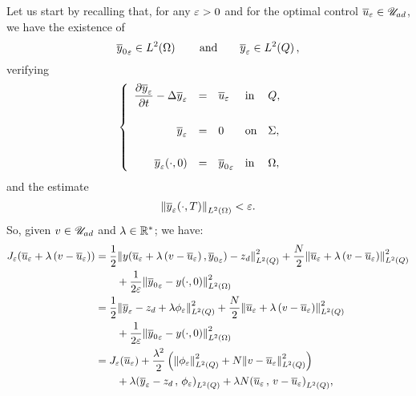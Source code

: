 Let us start by recalling that, for any $\varepsilon > 0$ and for the optimal
control ${\overline{u}}_{\varepsilon}\in{\mathscr{U}}_{ad}$, we have the existence of
\begin{equation*}
    {\overline{y}_{0}}_{\varepsilon}\in L^{2}\!\left({\Omega}\right)\qquad\text{and}\qquad
    {\overline{y}}_{\varepsilon}\in L^{2}\!\left({Q}\right),
\end{equation*}
verifying
\begin{equation*}
    \begin{cases}\displaystyle
        \begin{array}{rclll}
            \dfrac{\partial{}{\overline{y}}_{\varepsilon}}{\partial{}t} - \Delta{\overline{y}}_{\varepsilon} & = & {\overline{u}}_{\varepsilon} &
            \text{in} & Q,\\
            \\
            {\overline{y}}_{\varepsilon} & = & 0 & \text{on} & \Sigma,\\
            \\
            {{\overline{y}}_{\varepsilon}}\!\left({\cdot, 0}\right) & = & {\overline{y}_{0}}_{\varepsilon} &
            \text{in} & \Omega,
        \end{array}
    \end{cases}
\end{equation*}
and the estimate
\begin{equation*}
    {\left\|{ { {\overline{y}}_{\varepsilon} }\!\left({\cdot,T}\right)  }\right\|}_{L^{2}\left({\Omega}\right)} < \varepsilon.
\end{equation*}
So, given $v\in{\mathscr{U}}_{ad}$ and $\lambda\in{\mathbb{R}}^{*}$; we have:
\begin{equation*}
    \begin{split}
        J_{\veps}\!\left({%
            \bareps{u} + \lambda\left({v - \bareps{u}}\right)
        }\right) &= \dfrac{1}{2}\normecq{%
            y\!\left({%
                \bareps{u} + \lambda\left({v - \bareps{u}}\right),
                {\bar{y}_{0}}_{\veps}
            }\right) - z_{d}
        } + \dfrac{N}{2}\normecq{%
            \bareps{u} + \lambda\left({v - \bareps{u}}\right)
        }\\
        &\qquad + \dfrac{1}{2\veps}\normecohm{%
            {\bar{y}_{0}}_{\veps} - \condinitiale{y}
        }\\
        & = \dfrac{1}{2}\normecq{%
            \bareps{y} - z_{d} + \lambda{\fieps}
        } + \dfrac{N}{2}\normecq{%
            \bareps{u} + \lambda\left({v - \bareps{u}}\right)
        }\\
        &\qquad + \dfrac{1}{2\veps}\normecohm{%
            {\bar{y}_{0}}_{\veps} - \condinitiale{y}
        }\\
        & = J_{\veps}\!\left({\bareps{u}}\right) +
        \dfrac{{\lambda}^{2}}{2}\left({%
            \normecq{\fieps} + N\normecq{v - \bareps{u}}
        }\right)\\
        &\qquad + \lambda\scalaireq{%
            \bareps{y} - z_{d}
        }{%
            \fieps{}
        } + \lambda N\scalaireq{%
            \bareps{u}
        }{%
            v - \bareps{u}
        },
    \end{split}
\end{equation*}
